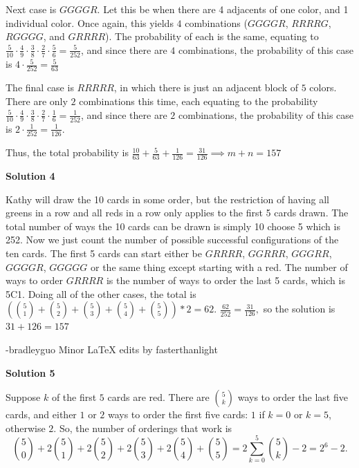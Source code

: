 \begin{enumerate}
 Next case is $GGGGR$. Let this be when there are 4 adjacents of one color, and 1 individual color. Once again, this yields $4$ combinations ($GGGGR$, $RRRRG$, $RGGGG$, and $GRRRR$). The probability of each is the same, equating to $\frac{5}{10}\cdot \frac{4}{9}\cdot \frac{3}{8}\cdot \frac{2}{7}\cdot \frac{5}{6}=\frac{5}{252}$, and since there are $4$ combinations, the probability of this case is $4\cdot \frac{5}{252}=\frac{5}{63}$

 The final case is $RRRRR$, in which there is just an adjacent block of $5$ colors. There are only $2$ combinations this time, each equating to the probability $\frac{5}{10}\cdot \frac{4}{9}\cdot \frac{3}{8}\cdot \frac{2}{7}\cdot \frac{1}{6}=\frac{1}{252}$, and since there are $2$ combinations, the probability of this case is $2\cdot \frac{1}{252}=\frac{1}{126}$. 

 Thus, the total probability is $\frac{10}{63}+\frac{5}{63}+\frac{1}{126}=\frac{31}{126} \implies m+n=\boxed{157}$




\textbf{Solution 4}

Kathy will draw the 10 cards in some order, but the restriction of having all greens in a row and all reds in a row only applies to the first 5 cards drawn. The total number of ways the 10 cards can be drawn is simply 10 choose 5 which is 252. Now we just count the number of possible successful configurations of the ten cards. The first 5 cards can start either be $GRRRR$, $GGRRR$, $GGGRR$, $GGGGR$, $GGGGG$ or the same thing except starting with a red. The number of ways to order $GRRRR$ is the number of ways to order the last 5 cards, which is 5C1. Doing all of the other cases, the total is $(\binom{5}{1}+\binom{5}{2}+\binom{5}{3}+\binom{5}{4}+\binom{5}{5})*2 = 62$. $\frac{62}{252} = \frac{31}{126},$ so the solution is $31 + 126 = \boxed{157}$

 -bradleyguo
Minor LaTeX edits by fasterthanlight

 



\textbf{Solution 5}

Suppose $k$ of the first $5$ cards are red. There are $\binom{5}{k}$ ways to order the last five cards, and either $1$ or $2$ ways to order the first five cards: $1$ if $k=0$ or $k=5$, otherwise $2$. So, the number of orderings that work is
 \[\binom{5}{0} + 2\binom{5}{1} + 2\binom{5}{2} + 2\binom{5}{3} + 2\binom{5}{4} + \binom{5}{5} = 2\sum_{k=0}^{5}\binom{5}{k} - 2 = 2^6 - 2.\]


\end{enumerate}
